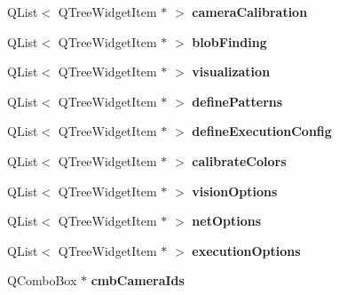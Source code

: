 \begin{DoxyCompactItemize}
\item 
\hypertarget{classMainWindow_ae9035f46a000100ab63f1120ca24fe6c}{Q\-List$<$ Q\-Tree\-Widget\-Item $\ast$ $>$ {\bfseries camera\-Calibration}}\label{classMainWindow_ae9035f46a000100ab63f1120ca24fe6c}

\item 
\hypertarget{classMainWindow_a775aad7d368aa4c677f29dfca49a0ad3}{Q\-List$<$ Q\-Tree\-Widget\-Item $\ast$ $>$ {\bfseries blob\-Finding}}\label{classMainWindow_a775aad7d368aa4c677f29dfca49a0ad3}

\item 
\hypertarget{classMainWindow_aa9dda32a86d3b8aa580702e4ff2b38b9}{Q\-List$<$ Q\-Tree\-Widget\-Item $\ast$ $>$ {\bfseries visualization}}\label{classMainWindow_aa9dda32a86d3b8aa580702e4ff2b38b9}

\item 
\hypertarget{classMainWindow_ad3cbf1c79dc9d0902d62c8a93cdb2858}{Q\-List$<$ Q\-Tree\-Widget\-Item $\ast$ $>$ {\bfseries define\-Patterns}}\label{classMainWindow_ad3cbf1c79dc9d0902d62c8a93cdb2858}

\item 
\hypertarget{classMainWindow_a686866bc623187ded39b2437a8201a7c}{Q\-List$<$ Q\-Tree\-Widget\-Item $\ast$ $>$ {\bfseries define\-Execution\-Config}}\label{classMainWindow_a686866bc623187ded39b2437a8201a7c}

\item 
\hypertarget{classMainWindow_af628c14836088c853d902d7691161ed4}{Q\-List$<$ Q\-Tree\-Widget\-Item $\ast$ $>$ {\bfseries calibrate\-Colors}}\label{classMainWindow_af628c14836088c853d902d7691161ed4}

\item 
\hypertarget{classMainWindow_a900f4c07ecd31f033fc927ec8d3f4095}{Q\-List$<$ Q\-Tree\-Widget\-Item $\ast$ $>$ {\bfseries vision\-Options}}\label{classMainWindow_a900f4c07ecd31f033fc927ec8d3f4095}

\item 
\hypertarget{classMainWindow_abe03fbb5ec71af5ebe78e6d350ff8610}{Q\-List$<$ Q\-Tree\-Widget\-Item $\ast$ $>$ {\bfseries net\-Options}}\label{classMainWindow_abe03fbb5ec71af5ebe78e6d350ff8610}

\item 
\hypertarget{classMainWindow_a07d591054dc439139f26228f13e08d16}{Q\-List$<$ Q\-Tree\-Widget\-Item $\ast$ $>$ {\bfseries execution\-Options}}\label{classMainWindow_a07d591054dc439139f26228f13e08d16}

\item 
\hypertarget{classMainWindow_ab31fbf0f301d3b11b4f37acd22acae75}{Q\-Combo\-Box $\ast$ {\bfseries cmb\-Camera\-Ids}}\label{classMainWindow_ab31fbf0f301d3b11b4f37acd22acae75}


\end{DoxyCompactItemize}
